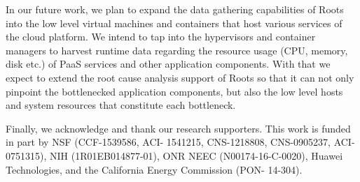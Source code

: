 In our future work, we plan to expand the data 
gathering capabilities of Roots into
the low level virtual machines and containers that host various services of the cloud
platform. We intend to tap into the hypervisors
and container managers to harvest runtime data regarding the resource usage (CPU, memory, disk etc.) of
PaaS services and other application components. With that we expect to extend
the root cause analysis support of Roots so that it can not only pinpoint the
bottlenecked application components, but also the low level hosts and system
resources that constitute each bottleneck.

Finally, we acknowledge and thank our research supporters.  This work is funded in part by NSF (CCF-1539586, ACI- 1541215, CNS-1218808, CNS-0905237, ACI-0751315), NIH (1R01EB014877-01), ONR NEEC (N00174-16-C-0020), Huawei Technologies, and the California Energy Commission (PON- 14-304).
